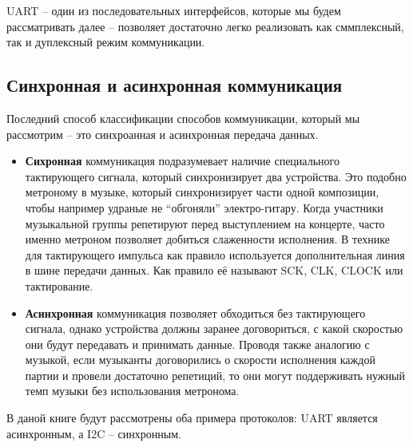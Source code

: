 \documentclass[../sparc.tex]{subfiles}
\begin{document}
\gls{UART} -- один из последовательных интерфейсов, которые мы будем
рассматривать далее -- позволяет достаточно легко реализовать как сммплексный,
так и дуплексный режим коммуникации.

\subsection{Синхронная и асинхронная коммуникация}

Последний способ классификации способов коммуникации, который мы рассмотрим --
это синхроанная и асинхронная передача данных.

\begin{itemize}
\item \textbf{Сихронная} коммуникация подразумевает наличие специального
  тактирующего сигнала, который синхронизирует два устройства.  Это подобно
  метроному в музыке, который синхронизирует части одной композиции, чтобы
  например удраные не ``обгоняли'' электро-гитару.  Когда участники музыкальной
  группы репетируют перед выступлением на концерте, часто именно метроном
  позволяет добиться слаженности исполнения.  В технике для тактирующего
  импульса как правило используется дополнительная линия в шине передачи данных.
  Как правило её называют SCK, CLK, CLOCK или тактирование.
\item \textbf{Асинхронная} коммуникация позволяет обходиться без тактирующего
  сигнала, однако устройства должны заранее договориться, с какой скоростью они
  будут передавать и принимать данные.  Проводя также аналогию с музыкой, если
  музыканты договорились о скорости исполнения каждой партии и провели
  достаточно репетиций, то они могут поддерживать нужный темп музыки без
  использования метронома.
\end{itemize}

В даной книге будут рассмотрены оба примера протоколов: \gls{UART} является
асинхронным, а \gls{I2C} -- синхронным.

\end{document}
